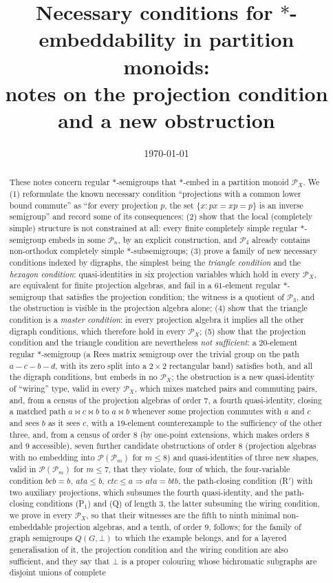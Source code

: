 \documentclass[11pt]{amsart}
\title[Embeddability in partition monoids]{Necessary conditions for $*$-embeddability in partition monoids:\\ notes on the projection condition and a new obstruction}
\date{\today}
\theoremstyle{definition}
\renewcommand{\P}{\mathcal{P}}
\begin{document}
\maketitle

\begin{abstract}
These notes concern regular $*$-semigroups that $*$-embed in a partition monoid $\P_X$. We (1) reformulate the known necessary condition ``projections with a common lower bound commute'' as ``for every projection $p$, the set $\{x : px=xp=p\}$ is an inverse semigroup'' and record some of its consequences; (2) show that the local (completely simple) structure is not constrained at all: every finite completely simple regular $*$-semigroup embeds in some $\P_n$, by an explicit construction, and $\P_4$ already contains non-orthodox completely simple $*$-subsemigroups; (3) prove a family of new necessary conditions indexed by digraphs, the simplest being the \emph{triangle condition} and the \emph{hexagon condition}: quasi-identities in six projection variables which hold in every $\P_X$, are equivalent for finite projection algebras, and fail in a $61$-element regular $*$-semigroup that satisfies the projection condition; the witness is a quotient of $\P_3$, and the obstruction is visible in the projection algebra alone; (4) show that the triangle condition is a \emph{master condition}: in every projection algebra it implies all the other digraph conditions, which therefore hold in every $\P_X$; (5) show that the projection condition and the triangle condition are nevertheless \emph{not sufficient}: a $20$-element regular $*$-semigroup (a Rees matrix semigroup over the trivial group on the path $a-c-b-d$, with its zero split into a $2\times2$ rectangular band) satisfies both, and all the digraph conditions, but embeds in no $\P_X$; the obstruction is a new quasi-identity of ``wiring'' type, valid in every $\P_X$, which mixes matched pairs and commuting pairs, and, from a census of the projection algebras of order $7$, a fourth quasi-identity, closing a matched path $a\bowtie c\bowtie b$ to $a\bowtie b$ whenever some projection commutes with $a$ and $c$ and sees $b$ as it sees $c$, with a $19$-element counterexample to the sufficiency of the other three, and, from a census of order $8$ (by one-point extensions, which makes orders $8$ and $9$ accessible), seven further candidate obstructions of order $8$ (projection algebras with no embedding into $\P(\P_m)$ for $m\le8$) and quasi-identities of three new shapes, valid in $\P(\P_m)$ for $m\le7$, that they violate, four of which, the four-variable condition $bcb=b,\ ata\le b,\ ctc\le a\Rightarrow ata=btb$, the path-closing condition (R$'$) with two auxiliary projections, which subsumes the fourth quasi-identity, and the path-closing conditions (P$_1$) and (Q) of length $3$, the latter subsuming the wiring condition, we prove in every $\P_X$, so that their witnesses are the fifth to ninth minimal non-embeddable projection algebras, and a tenth, of order $9$, follows; for the family of graph semigroups $Q(G,\bot)$ to which the example belongs, and for a layered generalisation of it, the projection condition and the wiring condition are also sufficient, and they say that $\bot$ is a proper colouring whose bichromatic subgraphs are disjoint unions of complete 
\end{abstract}
\end{document}
